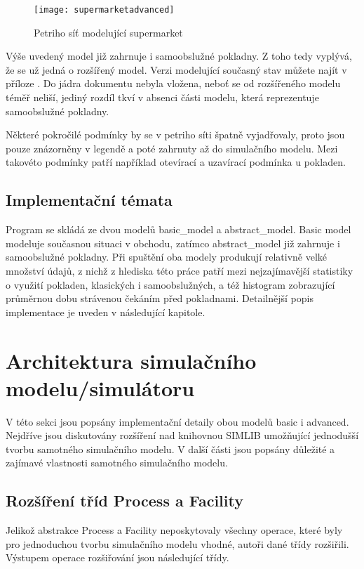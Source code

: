 \documentclass[12pt,a4paper,titlepage]{article}
\begin{document}
\begin{figure}[h]
\centering
\texttt{[image: supermarketadvanced]}
\caption{Petriho síť modelující supermarket}
\end{figure}


Výše uvedený model již zahrnuje i samoobslužné pokladny. Z toho tedy vyplývá, že se už jedná o rozšířený model. Verzi modelující současný stav můžete najít v příloze . Do jádra dokumentu nebyla vložena, neboť se od rozšířeného modelu téměř neliší, jediný rozdíl tkví v absenci části modelu, která reprezentuje samoobslužné pokladny. 

Některé pokročilé podmínky by se v petriho síti špatně vyjadřovaly, proto jsou pouze znázorněny v legendě a poté zahrnuty až do simulačního modelu. Mezi takovéto podmínky patří například otevírací a uzavírací podmínka u pokladen.

\subsection{Implementační témata}
Program se skládá ze dvou modelů basic\_model a abstract\_model. Basic model modeluje současnou situaci v obchodu, zatímco abstract\_model již zahrnuje i samoobslužné pokladny. Při spuštění oba modely produkují relativně velké množství údajů, z nichž z hlediska této práce patří mezi nejzajímavější statistiky o využití pokladen, klasických i samoobslužných, a též histogram zobrazující průměrnou dobu strávenou čekáním před pokladnami. Detailnější popis implementace je uveden v následující kapitole. 

\section{Architektura simulačního modelu/simulátoru}
V této sekci jsou popsány implementační detaily obou modelů basic i advanced. Nejdříve jsou diskutovány rozšíření nad knihovnou SIMLIB umožňující jednodušší tvorbu samotného simulačního modelu. V další části jsou popsány důležité a zajímavé vlastnosti samotného simulačního modelu.
\subsection{Rozšíření tříd Process a Facility}
Jelikož abstrakce Process a Facility neposkytovaly všechny operace, které byly pro jednoduchou tvorbu simulačního modelu vhodné, autoři dané třídy rozšiřili. Výstupem operace rozšiřování jsou následující třídy. 
\end{document}
